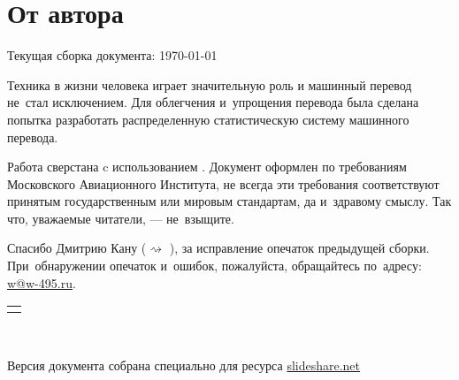 
\section*{От автора}

\begin{flushright}
	{\magic Текущая сборка документа: \today \ \thistime \\}
\end{flushright}
Техника в жизни человека играет значительную роль 
и машинный перевод не~стал исключением. 
Для облегчения и~упрощения перевода 
была сделана попытка разработать 
распределенную статистическую систему машинного перевода.

Работа сверстана c использованием {\comic \XeLaTeX}.
Документ оформлен по требованиям Московского Авиационного Института,
не всегда эти требования соответствуют принятым государственным или мировым стандартам,
да и~здравому смыслу. Так что, уважаемые читатели, --- не~взыщите.

Спасибо Дмитрию Кану ($\rightsquigarrow$ \cite{Кан:2011}), за исправление опечаток предыдущей сборки.
При~обнаружении опечаток и~ошибок, пожалуйста, обращайтесь по~адресу: 
\href{mailto:w@w-495.ru}{{\color{teal} w@w-495.ru}}.\\

\begin{center}
	\vspace{12pt}
	\begin{tabular}{p{7cm}}
		\hline \\
	\end{tabular}\\
	\vspace{12pt}
\end{center}
{\libertine
	Версия документа собрана специально для
	ресурса \href{http://www.slideshare.net/}{slideshare.net}
	
}

\pagebreak

